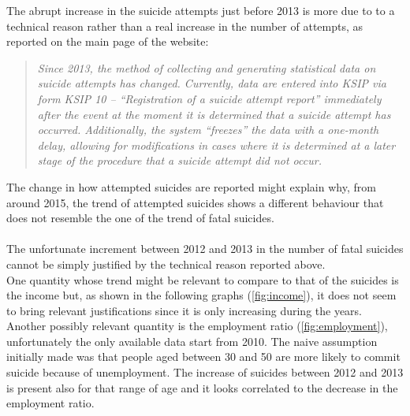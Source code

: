 \documentclass{article}
\begin{document}
The abrupt increase in the suicide attempts just before 2013 is more due to to a technical 
reason rather than a real increase in the number of attempts,
as reported on the main page of the website:
\begin{quote}
	\textit{Since 2013, the method of collecting and generating statistical data 
	on suicide attempts has changed. Currently, data are entered into KSIP via 
	form KSIP 10 – “Registration of a suicide attempt report” immediately after 
	the event at the moment it is determined that a suicide attempt has occurred. 
	Additionally, the system “freezes” the data with a one-month delay, allowing 
	for modifications in cases where it is determined at a later stage of the 
	procedure that a suicide attempt did not occur.}
\end{quote}
The change in how attempted suicides are reported might explain why, from around 2015, 
the trend of attempted suicides shows a different behaviour
that does not resemble the one of the trend of fatal suicides.  \\ \\
%
%
The unfortunate increment between 2012 and 2013 in the number of fatal suicides cannot be simply justified
by the technical reason reported above. \\
%
%
%
One quantity whose trend might be relevant to compare to that of the suicides
is the income but, as shown in the following graphs
(\ref{fig:income}), it does not seem to bring
relevant justifications since it is only increasing during the years.
%
%
%
Another possibly relevant quantity is the employment ratio (\ref{fig:employment}), unfortunately the only available data
start from 2010. The naive assumption initially made was that people aged between 30 and 50 are more likely
to commit suicide because of unemployment. The increase of suicides between 2012 and 2013 is 
present also for that range of age and it looks correlated to the decrease in the employment
ratio.
\end{document}
